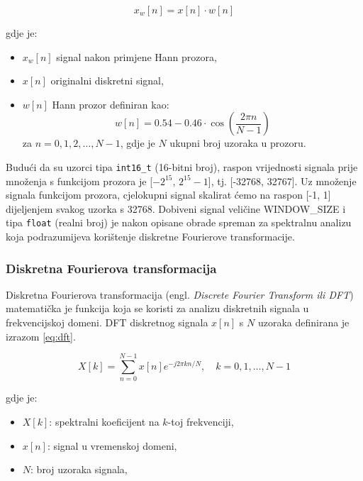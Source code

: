 \begin{equation}
    x_w[n] = x[n] \cdot w[n]
    \label{eq:window}
\end{equation}

gdje je:
\begin{itemize}
    \item \( x_w[n] \) signal nakon primjene Hann prozora,
    \item \( x[n] \) originalni diskretni signal,
    \item \( w[n] \) Hann prozor definiran kao:
    \begin{equation}
        w[n] = 0.54 - 0.46 \cdot \cos\left( \frac{2 \pi n}{N-1} \right)
    \end{equation}
    za \( n = 0, 1, 2, \dots, N-1 \),
    gdje je \( N \) ukupni broj uzoraka u prozoru.
\end{itemize}

Budući da su uzorci tipa \texttt{int16\_t} (16-bitni broj), raspon vrijednosti signala 
prije množenja s funkcijom prozora je [$-2^{15}$, $2^{15} - 1$], tj. [-32768, 32767]. Uz množenje
signala funkcijom prozora, cjelokupni signal skalirat ćemo na raspon [-1, 1] dijeljenjem svakog
uzorka s 32768. Dobiveni signal veličine WINDOW\_SIZE i tipa \texttt{float} (realni broj) je nakon
opisane obrade spreman za spektralnu analizu koja podrazumijeva korištenje diskretne Fourierove
transformacije.

\subsubsection{Diskretna Fourierova transformacija}
\label{sec:fft}

Diskretna Fourierova transformacija (engl. \textit{Discrete Fourier Transform ili DFT}) matematička je
funkcija koja se koristi za analizu diskretnih signala u frekvencijskoj domeni. 
DFT diskretnog signala \( x[n] \) s \( N \) uzoraka definirana je izrazom \ref{eq:dft}.

\begin{equation}
    X[k] = \sum_{n=0}^{N-1} x[n] e^{-j 2 \pi k n / N}, \quad k = 0, 1, \dots, N-1
    \label{eq:dft}
\end{equation}

gdje je:
\begin{itemize}
    \item \( X[k] \): spektralni koeficijent na \( k \)-toj frekvenciji,
    \item \( x[n] \): signal u vremenskoj domeni,
    \item \( N \): broj uzoraka signala,
\end{itemize}

